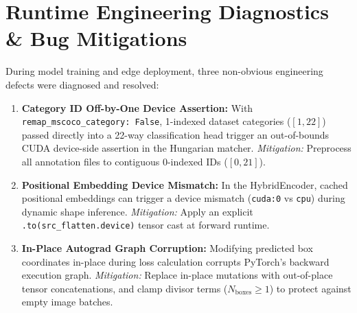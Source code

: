 \documentclass[conference]{IEEEtran}
\begin{document}
\section{Runtime Engineering Diagnostics \& Bug Mitigations}
During model training and edge deployment, three non-obvious engineering defects were diagnosed and resolved:
\begin{enumerate}
    \item \textbf{Category ID Off-by-One Device Assertion:} With \texttt{remap\_mscoco\_category: False}, 1-indexed dataset categories ($[1, 22]$) passed directly into a 22-way classification head trigger an out-of-bounds CUDA device-side assertion in the Hungarian matcher. \emph{Mitigation:} Preprocess all annotation files to contiguous 0-indexed IDs ($[0, 21]$).
    \item \textbf{Positional Embedding Device Mismatch:} In the HybridEncoder, cached positional embeddings can trigger a device mismatch (\texttt{cuda:0} vs \texttt{cpu}) during dynamic shape inference. \emph{Mitigation:} Apply an explicit \texttt{.to(src\_flatten.device)} tensor cast at forward runtime.
    \item \textbf{In-Place Autograd Graph Corruption:} Modifying predicted box coordinates in-place during loss calculation corrupts PyTorch's backward execution graph. \emph{Mitigation:} Replace in-place mutations with out-of-place tensor concatenations, and clamp divisor terms ($N_{\text{boxes}} \ge 1$) to protect against empty image batches.
\end{enumerate}
\end{document}
